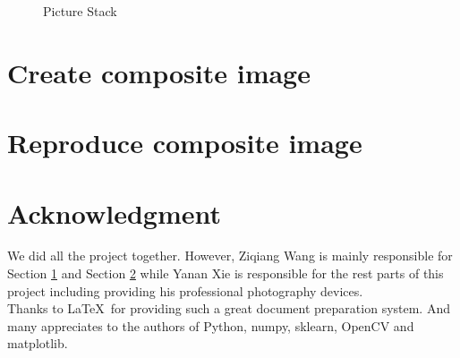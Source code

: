 \documentclass[10pt,twocolumn,letterpaper]{article}
\begin{document}
\begin{figure}[t]

\caption{Picture Stack}
\label{fig:picturestack}
\end{figure} 

\section{Create composite image}
\label{sec:create}

\section{Reproduce composite image}
\label{sec:reproduce}

\section{Acknowledgment}
We did all the project together. However, Ziqiang Wang is mainly responsible for
Section \ref{sec:create} and Section \ref{sec:reproduce} while Yanan Xie is responsible for the rest parts of this project including providing his professional photography devices.\\

Thanks to \LaTeX\ for providing such a great document preparation system. And many appreciates to the authors of Python, numpy, sklearn, OpenCV and matplotlib.\\
\end{document}
